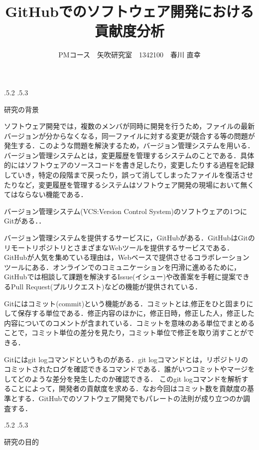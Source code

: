 \documentclass[uplatex]{jsarticle}
\title{\vspace{-14mm}GitHubでのソフトウェア開発における貢献度分析}
\author{PMコース　矢吹研究室　1342100　春川 直幸}
\date{}%
\makeatletter
\renewcommand{\section}{%
    \if@slide\clearpage\fi
    \@startsection{section}{1}{\z@}%
    {\Cvs \@plus.5\Cdp \@minus.2\Cdp}%
    {.5\Cvs \@plus.3\Cdp}%
    {\normalfont\raggedright}}
\makeatother
\begin{document}
\maketitle





\section{研究の背景}

ソフトウェア開発では，複数のメンバが同時に開発を行うため，ファイルの最新バージョンが分からなくなる，同一ファイルに対する変更が競合する等の問題が発生する．このような問題を解決するため，バージョン管理システムを用いる\cite{ikeda2014}．バージョン管理システムとは，変更履歴を管理するシステムのことである．具体的にはソフトウェアのソースコードを書き足したり，変更したりする過程を記録していき，特定の段階まで戻ったり，誤って消してしまったファイルを復活させたりなど，変更履歴を管理するシステムはソフトウェア開発の現場において無くてはならない機能である\cite{otuka2014}．

バージョン管理システム(VCS:Version Control System)のソフトウェアの1つにGitがある．\cite{shioya2014}．

バージョン管理システムを提供するサービスに，GitHubがある．GitHubはGitのリモートリポジトリとさまざまなWebツールを提供するサービスである．GitHubが人気を集めている理由は，Webベースで提供させるコラボレーションツールにある．オンラインでのコミュニケーションを円滑に進めるために，GitHubでは相談して課題を解決するIssue(イシュー)や改善案を手軽に提案できるPull Request(プルリクエスト)などの機能が提供されている\cite{shioya2014}．

Gitにはコミット(commit)という機能がある．コミットとは,修正をひと固まりにして保存する単位である．修正内容のほかに，修正日時，修正した人，修正した内容についてのコメントが含まれている．コミットを意味のある単位でまとめることで，コミット単位の差分を見たり，コミット単位で修正を取り消すことができる\cite{shioya2014}．

Gitにはgit logコマンドというものがある．git logコマンドとは，リポジトリのコミットされたログを確認できるコマンドである．誰がいつコミットやマージをしてどのような差分を発生したのか確認できる\cite{otuka2014}．
このgit logコマンドを解析することによって，開発者の貢献度を求める．なお今回はコミット数を貢献度の基準とする．GitHubでのソフトウェア開発でもパレートの法則が成り立つのか調査する．

\section{研究の目的}
\end{document}

